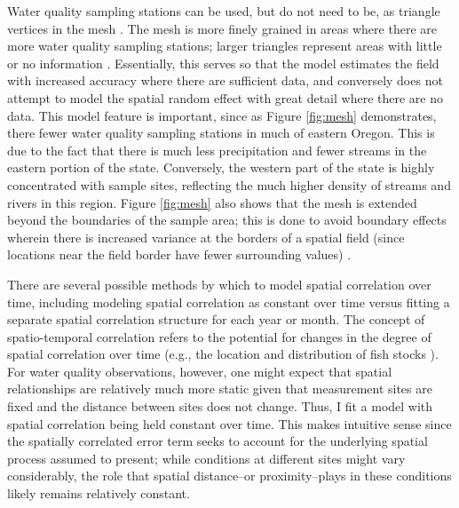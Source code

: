 \documentclass[12pt,a4paper,titlepage]{article}
\begin{document}
Water quality sampling stations can be used, but do not need to be, as triangle vertices in the mesh \parencite{lindgren2011}. The mesh is more finely grained in areas where there are more water quality sampling stations; larger triangles represent areas with little or no information \parencite{cosandey-godin2014}. Essentially, this serves so that the model estimates the field with increased accuracy where there are sufficient data, and conversely does not attempt to model the spatial random effect with great detail where there are no data. This model feature is important, since as Figure \ref{fig:mesh} demonstrates, there fewer water quality sampling stations in much of eastern Oregon. This is due to the fact that there is much less precipitation and fewer streams in the eastern portion of the state. Conversely, the western part of the state is highly concentrated with sample sites, reflecting the much higher density of streams and rivers in this region. Figure \ref{fig:mesh} also shows that the mesh is extended beyond the boundaries of the sample area; this is done to avoid boundary effects wherein there is increased variance at the borders of a spatial field (since locations near the field border have fewer surrounding values) \parencite{lindgren2013}.

There are several possible methods by which to model spatial correlation over time, including modeling spatial correlation as constant over time versus fitting a separate spatial correlation structure for each year or month. The concept of spatio-temporal correlation refers to the potential for changes in the degree of spatial correlation over time (e.g., the location and distribution of fish stocks \parencite{cosandey-godin2014}). For water quality observations, however, one might expect that spatial relationships are relatively much more static given that measurement sites are fixed and the distance between sites does not change. Thus, I fit a model with spatial correlation being held constant over time. This makes intuitive sense since the spatially correlated error term seeks to account for the underlying spatial process assumed to present; while conditions at different sites might vary considerably, the role that spatial distance--or proximity--plays in these conditions likely remains relatively constant.
\end{document}

